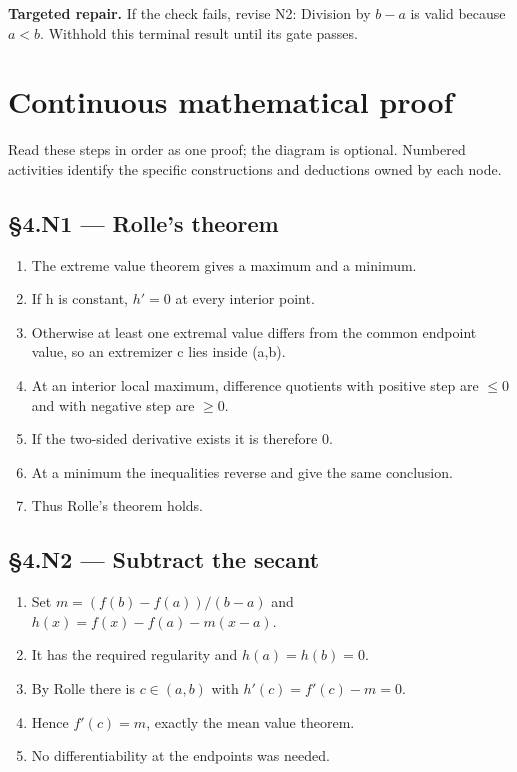 \documentclass[preprint,12pt,aps,pra,showkeys,amsmath,amssymb,superscriptaddress,floatfix]{revtex4-2}
\theoremstyle{definition}
\theoremstyle{remark}
\newcommand{\field}[2]{\par\smallskip\noindent\textbf{#1.} #2\par}
\begin{document}
\field{Targeted repair}{If the check fails, revise N2: Division by \(b-a\) is valid because
\(a<b\). Withhold this terminal result until its gate passes.}

\endgroup\clearpage\section{Continuous mathematical proof}\label{sec:proof}

Read these steps in order as one proof; the diagram is optional.
Numbered activities identify the specific constructions and deductions
owned by each node.

\subsection{§4.N1 --- Rolle's theorem}\label{n1-rolles-theorem}

\begin{enumerate}
\def\labelenumi{\arabic{enumi}.}
\item
  The extreme value theorem gives a maximum and a minimum.
\item
  If h is constant, \(h'=0\) at every interior point.
\item
  Otherwise at least one extremal value differs from the common endpoint
  value, so an extremizer c lies inside (a,b).
\item
  At an interior local maximum, difference quotients with positive step
  are \(\le 0\) and with negative step are \(\ge 0\).
\item
  If the two-sided derivative exists it is therefore 0.
\item
  At a minimum the inequalities reverse and give the same conclusion.
\item
  Thus Rolle's theorem holds.
\end{enumerate}

\subsection{§4.N2 --- Subtract the secant}\label{n2-subtract-the-secant}

\begin{enumerate}
\def\labelenumi{\arabic{enumi}.}
\item
  Set \(m=(f(b)-f(a))/(b-a)\) and \(h(x)=f(x)-f(a)-m(x-a)\).
\item
  It has the required regularity and \(h(a)=h(b)=0\).
\item
  By Rolle there is \(c\in (a,b)\) with \(h'(c)=f'(c)-m=0\).
\item
  Hence \(f'(c)=m\), exactly the mean value theorem.
\item
  No differentiability at the endpoints was needed.
\end{enumerate}
\end{document}
